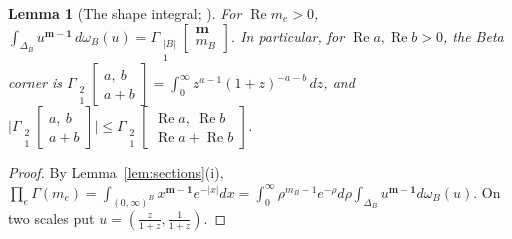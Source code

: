 \documentclass[11pt]{article}
\theoremstyle{plain}
\newtheorem{lemma}[prop]{Lemma}
\theoremstyle{definition}
\theoremstyle{remark}
\newcommand{\bm}{\mathbf m}
\newcommand{\Gst}[4]{\Gamma_{\substack{#1\\#2}}\!\begin{bmatrix}#3\\#4\end{bmatrix}}
\DeclareMathOperator{\re}{Re}
\begin{document}
\begin{lemma}[The shape integral; {\cite[Thm.~3.9, p.~21]{F}}]\label{lem:dirichlet}
For $\re m_e>0$, $\int_{\Delta_B}u^{\bm-\mathbf 1}\,d\omega_B(u)=\Gst{|B|}1{\bm}{m_B}$. In particular, for $\re a,\re b>0$, the Beta corner is $\Gst21{a,\ b}{a+b}=\int_0^\infty z^{a-1}(1+z)^{-a-b}\,dz$, and $\big|\Gst21{a,\ b}{a+b}\big|\le\Gst21{\re a,\ \re b}{\re a+\re b}$.
\end{lemma}

\begin{proof}
By Lemma~\ref{lem:sections}(i), $\prod_e\Gamma(m_e)=\int_{(0,\infty)^B}x^{\bm-\mathbf 1}e^{-|x|}dx=\int_0^\infty\rho^{m_B-1}e^{-\rho}d\rho\int_{\Delta_B}u^{\bm-\mathbf 1}d\omega_B(u)$. On two scales put $u=(\frac z{1+z},\frac1{1+z})$.
\end{proof}
\end{document}
